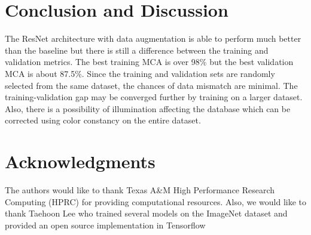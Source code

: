 \documentclass[conference]{IEEEtran}
\begin{document}
    \section{Conclusion and Discussion}\label{conclusion-and-discussion}

The ResNet architecture with data augmentation is able to perform much better than the baseline but there is still a difference between the training and validation metrics. The best training MCA is over 98\% but the best validation MCA is about 87.5\%. Since the training and validation sets are randomly selected from the same dataset, the chances of data mismatch are minimal. The training-validation gap may be converged further by training on a larger dataset. Also, there is a possibility of illumination affecting the database which can be corrected using color constancy on the entire dataset.

    \section{Acknowledgments}\label{acknowledgments}

The authors would like to thank Texas A\&M High Performance Research
Computing (HPRC) for providing computational resources. Also, we would
like to thank Taehoon Lee who trained several models on the ImageNet
dataset and provided an open source implementation in Tensorflow



 


    
    
    
    
\end{document}
